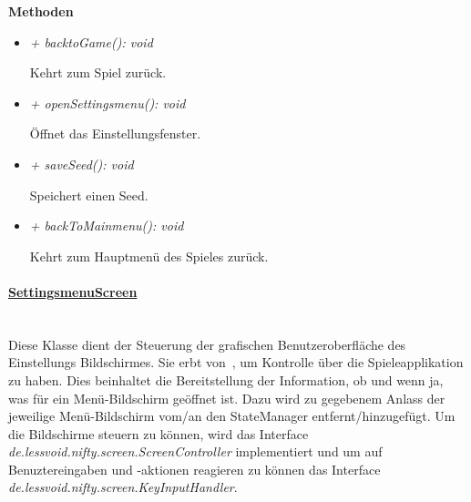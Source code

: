             \textbf{Methoden}					
            \begin{itemize}
                \item  \textit{+ backtoGame(): void} 
                    \begin{leftbar}[0.9\linewidth]
                        Kehrt zum Spiel zurück.\\
                    \end{leftbar}
                \item  \textit{+ openSettingsmenu(): void} 
                    \begin{leftbar}[0.9\linewidth]
                        Öffnet das Einstellungsfenster.\\
                    \end{leftbar}
                \item  \textit{+ saveSeed(): void} 
                    \begin{leftbar}[0.9\linewidth]
                        Speichert einen Seed.\\
                    \end{leftbar}
                \item  \textit{+ backToMainmenu(): void} 
                    \begin{leftbar}[0.9\linewidth]
                        Kehrt zum Hauptmenü des Spieles zurück.\\
                    \end{leftbar}
            \end{itemize}

        
        \paragraph{\underline{SettingsmenuScreen}} \mbox{}\\
            Diese Klasse dient der Steuerung der grafischen Benutzeroberfläche
            des Einstellungs Bildschirmes. Sie erbt von~, um Kontrolle über die 
            Spieleapplikation zu haben. Dies beinhaltet  die Bereitstellung der
            Information, ob und wenn ja, was für ein Menü-Bildschirm geöffnet ist.
            Dazu wird zu gegebenem Anlass der jeweilige Menü-Bildschirm vom/an den
            StateManager entfernt/hinzugefügt.
            Um die Bildschirme steuern zu können, wird das Interface\\
            \textit{de.lessvoid.nifty.screen.ScreenController} implementiert und um auf
            Benuztereingaben und -aktionen reagieren zu können das Interface
            \textit{de.lessvoid.nifty.screen.KeyInputHandler}. \par
            
